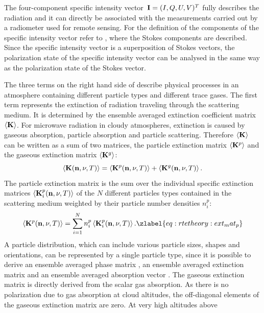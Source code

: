 The four-component specific intensity vector~${\bf I} = (I,Q,U,V)^T$
fully describes the radiation and it can directly be associated with
the measurements carried out by a radiometer used for remote sensing.
For the definition of the components of the specific intensity vector
refer to , where the Stokes
components are described. Since the specific intensity vector is a
superposition of Stokes vectors, the polarization state of the
specific intensity vector can be analysed in the same way as the
polarization state of the Stokes vector.

The three terms on the right hand side of  describe
physical processes in an atmosphere containing different particle
types and different trace gases. The first term represents the
extinction of radiation traveling through the scattering medium. It is
determined by the ensemble averaged extinction coefficient matrix
$\left\langle {\bf K} \right\rangle$.  For microwave radiation in cloudy
atmospheres, extinction is caused by gaseous absorption, particle
absorption and particle scattering. Therefore $\left\langle {\bf K} \right\rangle$
can be written as a sum of two matrices, the particle extinction
matrix $\left\langle {\bf K}^{p} \right\rangle$ and the gaseous extinction matrix
$\left\langle {\bf K}^{g} \right\rangle$:
\begin{equation}
  \left\langle {\bf K}({\bf n}, \nu, T) \right\rangle =
  \left\langle {\bf K}^{p}({\bf n}, \nu, T) \right\rangle+
  \left\langle {\bf K}^{g}({\bf n}, \nu, T) \right\rangle.
\end{equation}
The particle extinction matrix is the sum over the individual specific
extinction matrices $\left\langle {\bf K}_i^p({\bf n}, \nu, T) \right\rangle$ of
the $N$ different particles types contained in the scattering medium
weighted by their particle number densities $n^p_i$:
\begin{equation}
  \EnsAvr{\ExtMat^{p}(\PDir, \nu, T)} =
  \sum_{i=1}^N n^p_i \EnsAvr{\ExtMat_i^p (\PDir, \nu, T)}.
\zlabel{eq:rtetheory:ext_mat_p}
\end{equation}
A particle distribution, which can include various particle sizes,
shapes and orientations, can be represented by a single particle type,
since it is possible to derive an ensemble averaged phase matrix
, an ensemble averaged extinction matrix
 and an ensemble averaged absorption vector
.  The gaseous extinction matrix is directly derived
from the scalar gas absorption. As there is no polarization due to gas
absorption at cloud altitudes, the off-diagonal elements of the
gaseous extinction matrix are zero. At very high altitudes above
